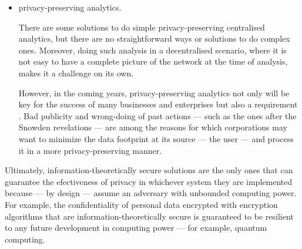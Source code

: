 \begin{itemize}[topsep=\parskip, parsep=\parskip, itemsep=\parskip]
    Although our focus in this work has been on decentralisation of centralised 
    \acp{is}, such as those where there can be various actors --- for example, in 
    \acp{osn}, there are also other scenarios where decentralisation could be of 
    interest
    
    For example, in home care\footnote{Medical care and safety are some controversial 
    matters when it comes to ideal privacy. Consider an unsconcious person in a 
    life threating situation, should her medical history be accessed without her 
    consent? It would be technologically possible to protect such sensitive personal 
    data but it simply does not make sense. However, it is clear it would be a privacy 
    violation allowed in many legislations because the preservation of the human 
    life is an unquestioned obligation.} --- where a nurse carries some sensitive 
    \ac{pii} in order to provide the right care to a patient and eventually returns 
    to the primary care facility with some new personal data about that patient, 
    in content-sharing or even in public ledging of transactions without a \ac{ttp} 
    --- such as those happening in the blockchain powering the crypto-currency \Bitcoin.
    
    \item privacy-preserving analytics.
    
    There are some solutions to do simple privacy-preserving centralised analytics, 
    but there are no straightforward ways or solutions to do complex ones. Moreover, 
    doing such analysis in a decentralised scenario, where it is not easy to have 
    a complete picture of the network at the time of analysis, makes it a challenge 
    on its own.
    
    However, in the coming years, privacy-preserving analytics not only will be 
    key for the success of many businesses and enterprises but also a requirement 
    \cite{LuZLLS14}. Bad publicity and wrong-doing of past actions --- such as the 
    ones after the Snowden revelations --- are among the reasons for which corporations 
    may want to minimize the data footprint at its source --- the user --- and 
    process it in a more privacy-preserving manner. 
    
\end{itemize}

Ultimately, information-theoretically secure solutions are the only ones that can 
guarantee the efectiveness of privacy in whichever system they are implemented because 
--- by design --- assume an adversary with unbounded computing power. 
For example, the confidentiality of personal data encrypted with encryption algorithms 
that are information-theoretically secure is guaranteed to be resilient to any future 
development in computing power --- for example, quantum computing. 

